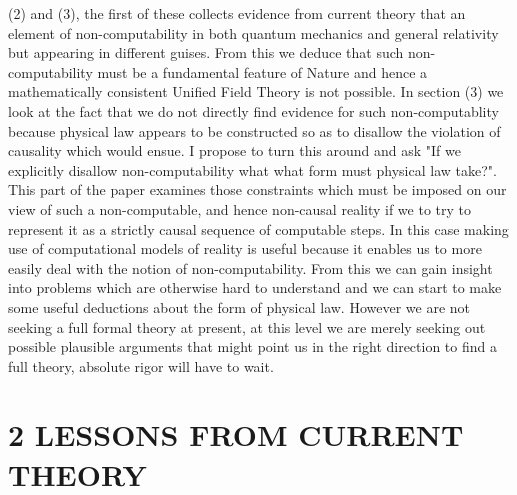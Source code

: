 \documentclass[
   ,final            %
  ]
  {aipproc}
\begin{document}
(2) and (3), the first of these collects
evidence from current theory that an element of non-computability in both quantum mechanics and general relativity
but appearing in different guises.  From this we deduce that such non-computability must be a fundamental
feature of Nature and hence a mathematically consistent Unified Field Theory is not possible. In section (3) we look at the fact that 
we do not directly find evidence for such non-computablity because physical law appears to be constructed
so as to disallow the violation of causality which would ensue. I propose to turn this around and ask "If
we explicitly disallow non-computability what what form must physical law take?". This part of
the paper examines those constraints which must be imposed on our view of such a non-computable, and
hence non-causal reality if we to try to represent it as a strictly causal sequence of computable steps. In this
case making use of computational models of reality is useful because it enables us to more easily deal with
the notion of non-computability. From this we can gain insight into problems which are otherwise hard to
understand and we can start to make some useful deductions about the form of physical law. However
we are not seeking a full formal theory at present, at this level we are merely seeking out possible plausible
arguments that might point us in the right direction to find a full theory, absolute rigor will have to wait.
\section{2 LESSONS FROM CURRENT THEORY }
\end{document}
